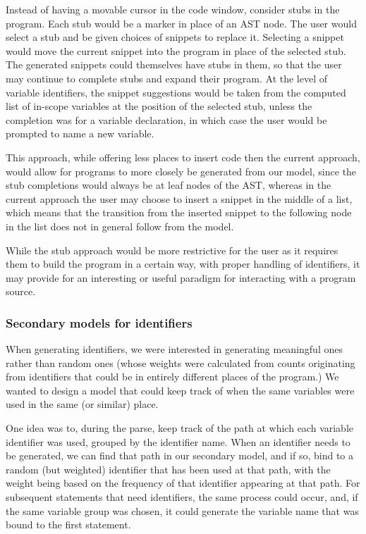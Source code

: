 \documentclass{article}
\begin{document}
Instead of having a movable cursor in the code window, consider stubs in the
program. Each stub would be a marker in place of an AST node. The user would
select a stub and be given choices of snippets to replace it. Selecting a
snippet would move the current snippet into the program in place of the selected
stub.  The generated snippets could themselves have stubs in them, so that the
user may continue to complete stubs and expand their program.  At the level of
variable identifiers, the snippet suggestions would be taken from the computed
list of in-scope variables at the position of the selected stub, unless the
completion was for a variable declaration, in which case the user would be
prompted to name a new variable.

This approach, while offering less places to insert code then the current
approach, would allow for programs to more closely be generated from our model,
since the stub completions would always be at leaf nodes of the AST, whereas in
the current approach the user may choose to insert a snippet in the middle of a
list, which means that the transition from the inserted snippet to the following
node in the list does not in general follow from the model.

While the stub approach would be more restrictive for the user as it requires
them to build the program in a certain way, with proper handling of identifiers,
it may provide for an interesting or useful paradigm for interacting with a program
source.

\subsubsection{Secondary models for identifiers}

When generating identifiers, we were interested in generating meaningful ones rather than random ones (whose weights were calculated from counts originating from identifiers that could be in entirely different places of the program.) We wanted to design a model that could keep track of when the same variables were used in the same (or similar) place.

One idea was to, during the parse, keep track of the path at which each variable identifier was used, grouped by the identifier name. When an identifier needs to be generated, we can find that path in our secondary model, and if so, bind to a random (but weighted) identifier that has been used at that path, with the weight being based on the frequency of that identifier appearing at that path. For subsequent statements that need identifiers, the same process could occur, and, if the same variable group was chosen, it could generate the variable name that was bound to the first statement.
\end{document}
